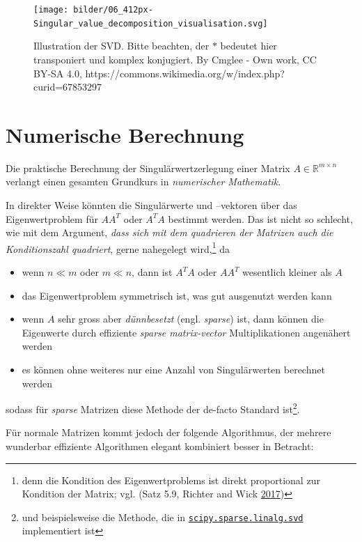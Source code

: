 \documentclass[
]{book}
\providecommand{\tightlist}{%
  \setlength{\itemsep}{0pt}\setlength{\parskip}{0pt}}
\theoremstyle{definition}
\theoremstyle{definition}
\theoremstyle{definition}
\theoremstyle{definition}
\theoremstyle{remark}
\begin{document}
\begin{figure}
\texttt{[image: bilder/06\_412px-Singular\_value\_decomposition\_visualisation.svg]} \caption{Illustration der SVD. Bitte beachten, der $*$ bedeutet hier transponiert und komplex konjugiert. By Cmglee - Own work, CC BY-SA 4.0, https://commons.wikimedia.org/w/index.php?curid=67853297}\label{fig:fig-SVD}
\end{figure}

\hypertarget{numerische-berechnung}{%
\section{Numerische Berechnung}\label{numerische-berechnung}}

Die praktische Berechnung der Singulärwertzerlegung einer Matrix \(A\in \mathbb R^{m\times n}\) verlangt einen gesamten Grundkurs in \emph{numerischer
Mathematik}.

In direkter Weise könnten die Singulärwerte und --vektoren über
das Eigenwertproblem für \(AA^T\) oder \(A^TA\) bestimmt werden.
Das ist nicht so schlecht, wie mit dem Argument, \emph{dass sich mit dem
quadrieren der Matrizen auch die Konditionszahl quadriert}, gerne nahegelegt wird,\footnote{denn die Kondition des Eigenwertproblems ist direkt proportional zur Kondition der Matrix; vgl.
  (Satz 5.9, Richter and Wick \protect\hyperlink{ref-RicW17}{2017})} da

\begin{itemize}
\tightlist
\item
  wenn \(n\ll m\) oder \(m\ll n\), dann ist \(A^TA\) oder \(AA^T\) wesentlich kleiner
  als \(A\)
\item
  das Eigenwertproblem symmetrisch ist, was gut ausgenutzt werden kann
\item
  wenn \(A\) sehr gross aber \emph{dünnbesetzt} (engl. \emph{sparse}) ist, dann können die
  Eigenwerte durch effiziente \emph{sparse matrix-vector} Multiplikationen
  angenähert werden
\item
  es können ohne weiteres nur eine Anzahl von Singulärwerten
  berechnet werden
\end{itemize}

sodass für \emph{sparse} Matrizen diese Methode der de-facto Standard ist\footnote{und
  beispielsweise die Methode, die in
  \href{https://docs.scipy.org/doc/scipy/reference/generated/scipy.sparse.linalg.svds.html}{\texttt{scipy.sparse.linalg.svd}}
  implementiert ist}.

Für normale Matrizen kommt jedoch der folgende Algorithmus, der mehrere
wunderbar effiziente Algorithmen elegant kombiniert besser in Betracht:
\end{document}
